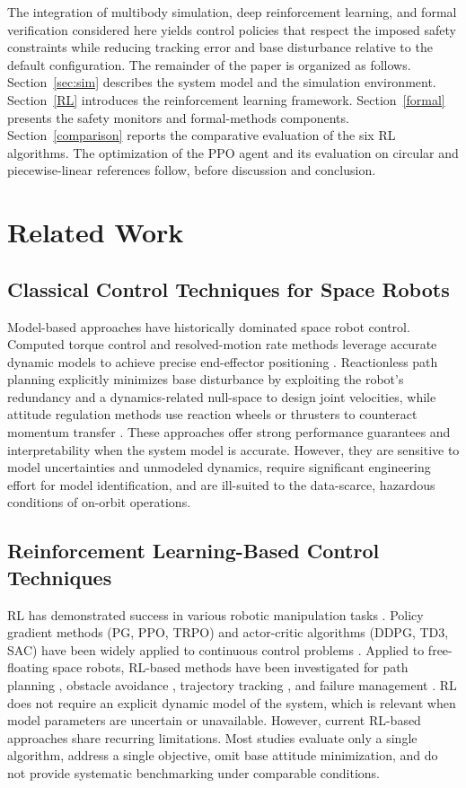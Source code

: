 \documentclass{ieeeaccess}
\begin{document}
The integration of multibody simulation, deep reinforcement learning, and formal verification considered here yields
control policies that respect the imposed safety constraints while reducing tracking error and base
disturbance relative to the default configuration. The remainder of the paper is organized as
follows. Section~\ref{sec:sim} describes the system model and the simulation environment. Section~\ref{RL} introduces the reinforcement
learning framework. Section~\ref{formal} presents the safety monitors and formal-methods components. Section~\ref{comparison} reports the comparative
evaluation of the six RL algorithms. The optimization of the PPO agent and its
evaluation on circular and piecewise-linear references follow, before discussion and conclusion.

\section{Related Work}

\subsection{Classical Control Techniques for Space Robots}
Model-based approaches have historically dominated space robot control. Computed torque control and resolved-motion rate
methods leverage accurate dynamic models to achieve precise end-effector positioning \cite{b1}. Reactionless path planning
explicitly
minimizes base disturbance by exploiting the robot's redundancy and a dynamics-related null-space to design
joint velocities, while attitude regulation methods use reaction wheels or thrusters
to counteract momentum transfer \cite{b6,kaigom2011optimal}. These approaches offer strong performance guarantees and
interpretability when the system model is accurate. However, they are sensitive to model uncertainties
and unmodeled
dynamics, require significant engineering effort for model identification, and are ill-suited to the data-scarce,
hazardous conditions of on-orbit operations.

\subsection{Reinforcement Learning-Based Control Techniques}
RL has demonstrated success in various robotic manipulation tasks \cite{b2,b7}.
Policy gradient methods (PG, PPO, TRPO) and actor-critic algorithms (DDPG, TD3, SAC)
have been widely applied to continuous control problems \cite{b14,b15,b17,b18,b21}.
Applied to free-floating space robots, RL-based methods have been investigated for path planning \cite{wu2020reinforcement,al2024path},
obstacle avoidance \cite{huang2023obstacle}, trajectory tracking \cite{hu2025deep}, and failure management \cite{d2024failure}.
RL does not require an explicit dynamic model of the system, which is relevant
when model parameters are uncertain or unavailable. However, current RL-based approaches share recurring limitations.
Most studies
evaluate only a single algorithm, address a single objective, omit base attitude minimization, and
do not provide systematic benchmarking under comparable conditions.
\end{document}
